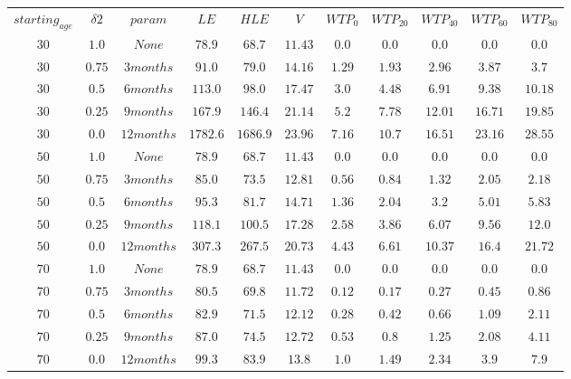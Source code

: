 \begin{tabular}{ccccccccccc}
$starting_{age}$ & ${\delta}2$ & $param$ & $LE$ & $HLE$ & $V$ & $WTP_{0}$ & $WTP_{20}$ & $WTP_{40}$ & $WTP_{60}$ & $WTP_{80}$\\
$30$ & $1.0$ & $None$ & $78.9$ & $68.7$ & $11.43$ & $0.0$ & $0.0$ & $0.0$ & $0.0$ & $0.0$\\
$30$ & $0.75$ & $3 months$ & $91.0$ & $79.0$ & $14.16$ & $1.29$ & $1.93$ & $2.96$ & $3.87$ & $3.7$\\
$30$ & $0.5$ & $6 months$ & $113.0$ & $98.0$ & $17.47$ & $3.0$ & $4.48$ & $6.91$ & $9.38$ & $10.18$\\
$30$ & $0.25$ & $9 months$ & $167.9$ & $146.4$ & $21.14$ & $5.2$ & $7.78$ & $12.01$ & $16.71$ & $19.85$\\
$30$ & $0.0$ & $12 months$ & $1782.6$ & $1686.9$ & $23.96$ & $7.16$ & $10.7$ & $16.51$ & $23.16$ & $28.55$\\
$50$ & $1.0$ & $None$ & $78.9$ & $68.7$ & $11.43$ & $0.0$ & $0.0$ & $0.0$ & $0.0$ & $0.0$\\
$50$ & $0.75$ & $3 months$ & $85.0$ & $73.5$ & $12.81$ & $0.56$ & $0.84$ & $1.32$ & $2.05$ & $2.18$\\
$50$ & $0.5$ & $6 months$ & $95.3$ & $81.7$ & $14.71$ & $1.36$ & $2.04$ & $3.2$ & $5.01$ & $5.83$\\
$50$ & $0.25$ & $9 months$ & $118.1$ & $100.5$ & $17.28$ & $2.58$ & $3.86$ & $6.07$ & $9.56$ & $12.0$\\
$50$ & $0.0$ & $12 months$ & $307.3$ & $267.5$ & $20.73$ & $4.43$ & $6.61$ & $10.37$ & $16.4$ & $21.72$\\
$70$ & $1.0$ & $None$ & $78.9$ & $68.7$ & $11.43$ & $0.0$ & $0.0$ & $0.0$ & $0.0$ & $0.0$\\
$70$ & $0.75$ & $3 months$ & $80.5$ & $69.8$ & $11.72$ & $0.12$ & $0.17$ & $0.27$ & $0.45$ & $0.86$\\
$70$ & $0.5$ & $6 months$ & $82.9$ & $71.5$ & $12.12$ & $0.28$ & $0.42$ & $0.66$ & $1.09$ & $2.11$\\
$70$ & $0.25$ & $9 months$ & $87.0$ & $74.5$ & $12.72$ & $0.53$ & $0.8$ & $1.25$ & $2.08$ & $4.11$\\
$70$ & $0.0$ & $12 months$ & $99.3$ & $83.9$ & $13.8$ & $1.0$ & $1.49$ & $2.34$ & $3.9$ & $7.9$\\
\end{tabular}

